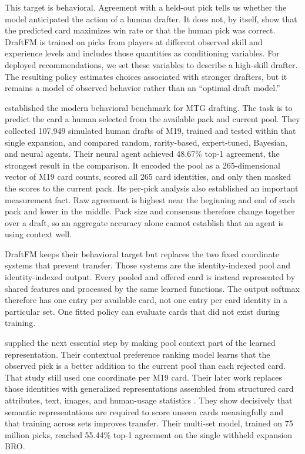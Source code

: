 \documentclass[11pt]{article}
\numberwithin{equation}{section}
\begin{document}
This target is behavioral. Agreement with a held-out pick tells us whether the
model anticipated the action of a human drafter. It does not, by itself, show
that the predicted card maximizes win rate or that the human pick was correct.
DraftFM is trained on picks from players at different observed skill and
experience levels and includes those quantities as conditioning variables. For
deployed recommendations, we set these variables to describe a high-skill
drafter. The resulting policy estimates choices associated with stronger
drafters, but it remains a model of observed behavior rather than an ``optimal
draft model.''

\citet{ward2021} established the modern behavioral benchmark for MTG drafting.
The task is to predict the card a human selected from the available pack and
current pool. They collected 107,949 simulated human
drafts of M19, trained and tested within that single expansion, and compared
random, rarity-based, expert-tuned, Bayesian, and neural agents. Their neural
agent achieved 48.67\% top-1 agreement, the strongest result in the comparison.
It encoded the pool as a 265-dimensional vector of M19 card counts, scored all
265 card identities, and only then masked the scores to the current pack. Its
per-pick analysis also established an important measurement fact. Raw agreement
is highest near the beginning and end of each pack and lower in the middle.
Pack size and consensus therefore change together over a draft, so an aggregate
accuracy alone cannot establish that an agent is using context well.

DraftFM keeps their behavioral target but replaces the two fixed coordinate
systems that prevent transfer. Those systems are the identity-indexed pool and
identity-indexed output. Every pooled and offered card is instead represented by shared features
and processed by the same learned functions. The output softmax therefore has
one entry per available card, not one entry per card identity in a particular
set. One fitted policy can evaluate cards that did not exist during training.

\citet{bertram2021} supplied the next essential step by making
pool context part of the learned representation. Their contextual preference
ranking model learns that the observed pick is a better addition to the current
pool than each rejected card. That study still used one coordinate
per M19 card. Their later work replaces those identities with generalized
representations assembled from structured card attributes, text, images, and
human-usage statistics \citep{bertram2024a,bertram2024b}. They show decisively that semantic
representations are required to score unseen cards meaningfully and that
training across sets improves transfer. Their multi-set model, trained on 75
million picks, reached 55.44\% top-1 agreement on the single withheld expansion
BRO.
\end{document}
